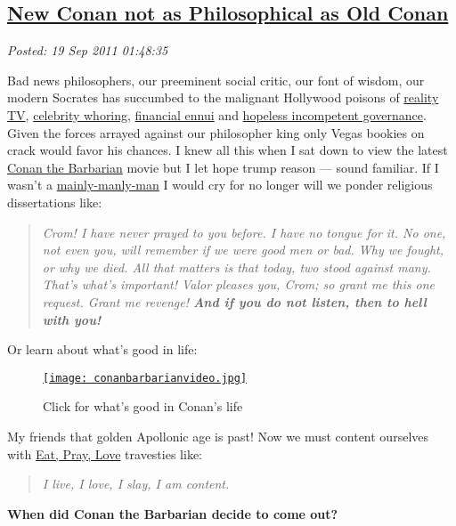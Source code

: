 %

\subsection*{\href{https://bakerjd99.wordpress.com/2011/09/18/new-conan-not-as-philosophical-as-old-conan/}{New Conan not as Philosophical as Old Conan}}


\noindent\emph{Posted: 19 Sep 2011 01:48:35}
\vspace{6pt}

Bad news philosophers, our preeminent social critic, our font of wisdom,
our modern Socrates has succumbed to the malignant Hollywood poisons of
\href{http://www.youjustmademylist.com/?p=562}{reality TV},
\href{http://www.spike.com/articles/0xugni/the-top-10-whore-rific-female-celebrities}{celebrity
whoring},
\href{http://www.bizjournals.com/seattle/blog/2011/09/scant-improvement-in-nations.html}{financial
ennui} and \href{http://www.whitehouse.gov/}{hopeless incompetent
governance}. Given the forces arrayed against our philosopher king only
Vegas bookies on crack would favor his chances. I knew all this when I
sat down to view the latest
\href{http://www.imdb.com/video/screenplay/vi3994852377/}{Conan the
Barbarian} movie but I let hope trump reason --- sound familiar. If I
wasn't a
\href{http://staff.rio.edu/miket/attitude.htm}{mainly-manly-man} I would
cry for no longer will we ponder religious dissertations like:

\begin{quotation}
\emph{Crom! I have never prayed to you before. I have no tongue for it.
No one, not even you, will remember if we were good men or bad. Why we
fought, or why we died. All that matters is that today, two stood
against many. That's what's important! Valor pleases you, Crom; so grant
me this one request. Grant me revenge! \textbf{And if you do not listen,
then to hell with you!}}
\end{quotation}

Or learn about what's good in life:

\captionsetup[figure]{labelformat=empty}
\begin{figure}[htbp]
\centering
\href{http://www.youtube.com/watch?v=6PQ6335puOc}{\texttt{[image: conanbarbarianvideo.jpg]}}
\caption{Click for what's good in Conan's life}
\label{fig:conanlife}
\end{figure}


My friends that golden Apollonic age is past! Now we must content
ourselves with
\href{http://bakerjd99.wordpress.com/2010/08/16/binge-pretend-boink/}{Eat,
Pray, Love} travesties like:

\begin{quotation}
\emph{I live, I love, I slay, I am content.}
\end{quotation}

\textbf{When did Conan the Barbarian decide to come out?}

%